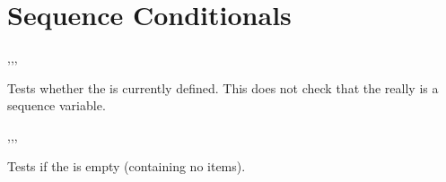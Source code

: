 \documentclass[oneside]{book}
\begin{document}

\section{Sequence Conditionals}

\begin{function}{\SeqIfExist,\SeqIfExistT,\SeqIfExistF,\SeqIfExistTF}
\begin{syntax}
 
  
  
   
\end{syntax}
Tests whether the  is currently defined.  This does not
check that the  really is a sequence variable.
\begin{demohigh}
\SeqIfExistTF {} {}
\SeqIfExistTF {} {}
\end{demohigh}
\end{function}

\begin{function}{\SeqVarIfEmpty,\SeqVarIfEmptyT,\SeqVarIfEmptyF,\SeqVarIfEmptyTF}
\begin{syntax}
 
  
  
   
\end{syntax}
Tests if the  is empty (containing no items).
\begin{demohigh}
\SeqSetFromClist {}
\SeqVarIfEmptyTF {} {}
\SeqClear \lTmpaSeq
\SeqVarIfEmptyTF {} {}
\end{demohigh}
\end{function}
\end{document}
